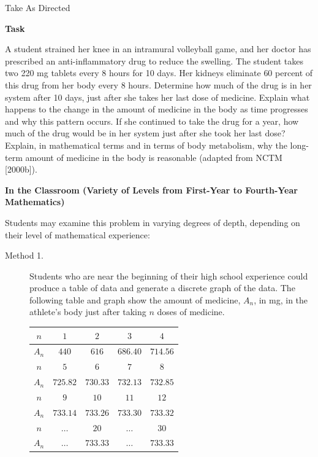 \documentclass[
  10pt,
  a4paper,
  landscape,
  twoside,
  openany
]{scrbook}
\begin{document}
\TriExample
{
Take As Directed
}
{
\noindent
\textbf{Task}

A student strained her knee in an intramural volleyball game, and her doctor has prescribed an anti-inflammatory drug to reduce the swelling. The student takes two 220 mg tablets every 8 hours for 10 days. Her kidneys eliminate $60$ percent of this drug from her body every 8 hours. Determine how much of the drug is in her system after 10 days, just after she takes her last dose of medicine. Explain what happens to the change in the amount of medicine in the body as time progresses and why this pattern occurs. If she continued to take the drug for a year, how much of the drug would be in her system just after she took her last dose? Explain, in mathematical terms and in terms of body metabolism, why the long-term amount of medicine in the body is reasonable (adapted from NCTM [2000b]).

\noindent
\textbf{In the Classroom (Variety of Levels from First-Year to Fourth-Year Mathematics)}

Students may examine this problem in varying degrees of depth, depending on their level of mathematical experience:

\begin{description}
  \item[Method 1.] Students who are near the beginning of their high school experience could produce a table of data and generate a discrete graph of the data. The following table and graph show the amount of medicine, $A_n$, in mg, in the athlete's body just after taking $n$ doses of medicine.
  
  \begin{center}
  \setlength{\tabcolsep}{5pt}
  \begin{tabular}{|c|c|c|c|c|}
  \hline
  $n$   & $1$      & $2$      & $3$      & $4$      \\
  \hline
  $A_n$ & $440$    & $616$    & $686.40$ & $714.56$ \\
  \hline
  $n$   & $5$      & $6$      & $7$      & $8$      \\
  \hline
  $A_n$ & $725.82$ & $730.33$ & $732.13$ & $732.85$ \\
  \hline
  $n$   & $9$      & $10$     & $11$     & $12$     \\
  \hline
  $A_n$ & $733.14$ & $733.26$ & $733.30$ & $733.32$ \\
  \hline
  $n$   & $\dots$  & $20$     & $\dots$  & $30$     \\
  \hline
  $A_n$ & $\dots$  & $733.33$ & $\dots$  & $733.33$ \\
  \hline
  \end{tabular}
  \end{center}


\end{description}}
\end{document}
